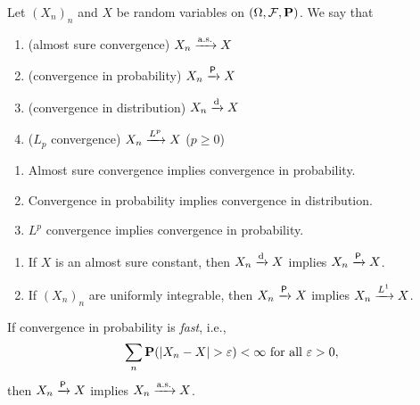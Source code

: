 
\begin{definition}[convergence] \label{def:convergence}
    Let $(X_n)_n$ and $X$ be random variables on $(\Omega, \F, \P)$.
    We say that
    \begin{enumerate}
        \item (almost sure convergence) $X_n \asto X$
        \item (convergence in probability) $X_n \pto X$
        \item (convergence in distribution) $X_n \dto X$
        \item ($L_p$ convergence) $X_n \lpto X$ ($p \ge 0$)
    \end{enumerate}
\end{definition}

\begin{proposition}
    \begin{enumerate}
        \item Almost sure convergence implies convergence in probability.
        \item Convergence in probability implies convergence in distribution.
        \item $L^p$ convergence implies convergence in probability.
    \end{enumerate}
\end{proposition}

\begin{proposition}
    \begin{enumerate}
        \item If $X$ is an almost sure constant, then $X_n \dto X$
            implies $X_n \pto X$.
        \item If $(X_n)_n$ are uniformly integrable, then $X_n \pto X$
            implies $X_n \lpto[1] X$.
    \end{enumerate}
\end{proposition}

\begin{proposition}
    If convergence in probability is \emph{fast}, i.e., \[
        \sum_n \P(\abs{X_n - X} > \eps) < \infty \text{ for all } \eps > 0,
    \] then $X_n \pto X$ implies $X_n \asto X$.
\end{proposition}

